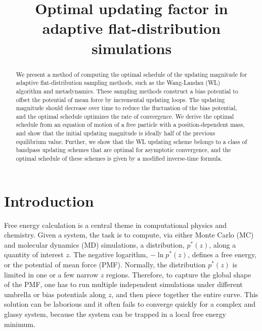 \documentclass[reprint, floatfix]{revtex4-1}
\begin{document}
\title{Optimal updating factor in adaptive flat-distribution simulations}



\begin{abstract}
  We present a method of computing the optimal schedule
  of the updating magnitude
  for adaptive flat-distribution sampling methods,
  such as the Wang-Landau (WL) algorithm and metadynamics.
  These sampling methods
  construct a bias potential to offset
  the potential of mean force
  by incremental updating loops.
  The updating magnitude should decrease over time
  to reduce the fluctuation of the bias potential,
  and the optimal schedule optimizes
  the rate of convergence.
  We derive the optimal schedule from
  an equation of motion
  of a free particle with a position-dependent mass,
  and show that
  the initial updating magnitude is ideally half of
  the previous equilibrium value.
  Further,
  we show that the WL updating scheme
  belongs to a class of bandpass updating schemes
  that are optimal for asymptotic convergence,
  and the optimal schedule of these schemes
  is given by a modified inverse-time formula.
\end{abstract}

\maketitle



\section{Introduction}



Free energy calculation\cite{frenkel, newman} is a central theme
in computational physics and chemistry.
%
Given a system,
the task is to compute,
via either Monte Carlo\cite{frenkel, newman, landau_binder} (MC)
and molecular dynamics\cite{frenkel, karplus2002} (MD) simulations,
a distribution, $p^*(z)$,
along a quantity of interest $z$.
%
The negative logarithm,
$-\ln p^*(z)$,
defines a free energy,
or the potential of mean force (PMF).
%
Normally, the distribution $p^*(z)$ is
limited in one or a few narrow $z$ regions.
%
Therefore, to capture the global shape
of the PMF,
one has to run multiple independent simulations
under different umbrella or bias potentials
along $z$\cite{mezei1987, berg1992, lee1993},
and then piece together the entire curve.
%
This solution can be laborious %
and it often fails to converge quickly
for a complex and glassy system,
because the system can be trapped
in a local free energy minimum.
\end{document}
